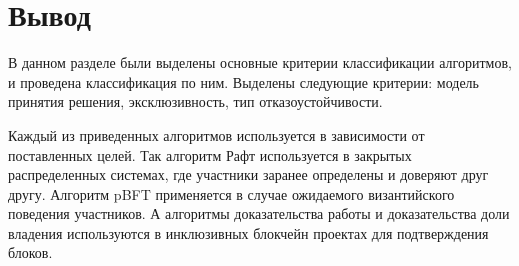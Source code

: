     \section{Вывод}

        В данном разделе были выделены основные критерии классификации алгоритмов, и проведена классификация по ним. Выделены следующие критерии: модель принятия решения, эксклюзивность, тип отказоустойчивости.
            
        Каждый из приведенных алгоритмов используется в зависимости от поставленных целей. Так алгоритм Рафт используется в закрытых распределенных системах, где участники заранее определены и доверяют друг другу. Алгоритм pBFT применяется в случае ожидаемого византийского поведения участников. А алгоритмы доказательства работы и доказательства доли владения используются в инклюзивных блокчейн проектах для подтверждения блоков.